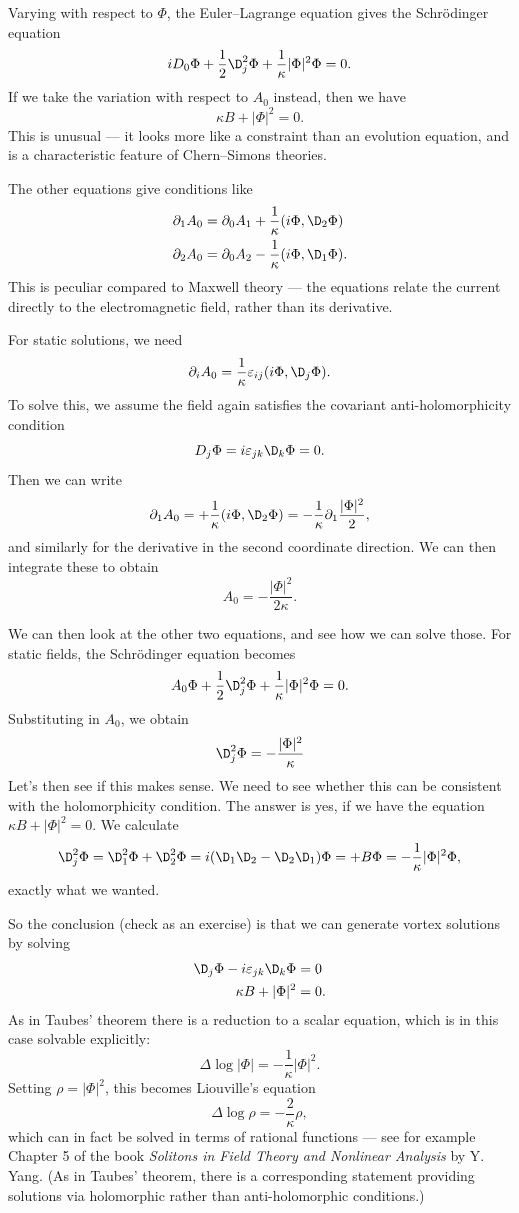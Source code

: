 \documentclass[a4paper]{article}
\begin{document}
Varying with respect to $\Phi$, the Euler--Lagrange equation gives the Schr\"odinger equation
\[
  i D_0 \Phi + \frac{1}{2} \D_j^2 \Phi + \frac{1}{\kappa} |\Phi|^2 \Phi = 0.
\]
If we take the variation with respect to $A_0$ instead, then we have
\[
  \kappa B + |\Phi|^2 = 0.
\]
This is unusual --- it looks more like a constraint than an evolution equation, and is a characteristic feature of Chern--Simons theories.

The other equations give conditions like
\begin{align*}
  \partial_1 A_0 &= \partial_0 A_1 + \frac{1}{\kappa} (i \Phi, \D_2 \Phi)\\
  \partial_2 A_0 &= \partial_0 A_2 - \frac{1}{\kappa} (i \Phi, \D_1 \Phi).
\end{align*}
This is peculiar compared to Maxwell theory --- the equations relate the current directly to the electromagnetic field, rather than its derivative.

For static solutions, we need
\[
  \partial_i A_0 = \frac{1}{\kappa} \varepsilon_{ij} (i \Phi, \D_j \Phi).
\]
To solve this, we assume the field again satisfies the covariant anti-holomorphicity condition
\[
  D_j \Phi = i \varepsilon_{jk} \D_k \Phi = 0.
\]
Then we can write
\[
  \partial_1 A_0 = +\frac{1}{\kappa} (i \Phi, \D_2 \Phi) = - \frac{1}{\kappa} \partial_1 \frac{|\Phi|^2}{2},
\]
and similarly for the derivative in the second coordinate direction. We can then integrate these to obtain
\[
  A_0 = -\frac{|\Phi|^2}{ 2 \kappa}.
\]

We can then look at the other two equations, and see how we can solve those. For static fields, the Schr\"odinger equation becomes
\[
  A_0 \Phi + \frac{1}{2} \D_j^2 \Phi + \frac{1}{\kappa} |\Phi|^2 \Phi = 0.
\]
Substituting in $A_0$, we obtain
\[
  \D_j^2 \Phi = -\frac{|\Phi|^2}{\kappa}
\]
Let's then see if this makes sense. We need to see whether this can be consistent with the holomorphicity condition. The answer is yes, if we have the equation $\kappa B + |\Phi|^2 = 0$. We calculate
\[
  \D_j^2 \Phi = \D_1^2 \Phi + \D_2^2 \Phi = i (\D_1 \D_2 - \D_2 \D_1) \Phi = + B \Phi = -\frac{1}{\kappa} |\Phi|^2 \Phi,
\]
exactly what we wanted.

So the conclusion (check as an exercise) is that we can generate vortex solutions by solving
\begin{align*}
  \D_j \Phi - i \varepsilon_{jk} \D_k \Phi &= 0\\
  \kappa B + |\Phi|^2 &= 0.
\end{align*}
As in Taubes' theorem there is a reduction to a scalar equation, which is in this case solvable explicitly:
\[
  \Delta \log |\Phi| = -\frac{1}{\kappa} |\Phi|^2.
\]
Setting $\rho = |\Phi|^2$, this becomes Liouville's equation
\[
  \Delta \log \rho = -\frac{2}{\kappa}\rho,
\]
which can in fact be solved in terms of rational functions --- see for example Chapter 5 of the book \emph{Solitons in Field Theory and Nonlinear Analysis} by Y. Yang. (As in Taubes' theorem, there is a corresponding statement providing solutions via holomorphic rather than anti-holomorphic conditions.)
\end{document}
